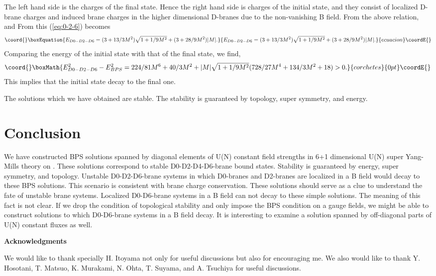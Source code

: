 \documentclass[a4paper,12pt]{article}
\begin{document}
The left hand side is the charges of the final state. Hence the right hand side is charges of the initial state, and they consist of localized D-brane charges and induced brane charges in the higher dimensional D-branes due to the non-vanishing B field. From the above relation, \coordHE{} and \coordHE{} From this (\ref{eq:0-2-6}) becomes
\begin{equation}\coord{}\boxEquation{
E_{D0-D2-D6}= (3+13/3M^2)\sqrt{1+1/9M^2} + (3+28/9M^2)|M|.
}{
E_{D0-D2-D6}= (3+13/3M^2)\sqrt{1+1/9M^2} + (3+28/9M^2)|M|.
}{ecuacion}\coordE{}\end{equation}
Comparing the energy of the initial state with that of the final state, we find,
\[\coord{}\boxMath{
E_{D0-D2-D6}^2-E_{BPS}^2 = 224/81M^6+40/3M^2+|M|\sqrt{1+1/9M^2}(728/27M^4+134/3M^2+18) > 0.
}{corchetes}{0pt}\coordE{}\]
This implies that the initial state decay to the final one.

 The solutions which we have obtained are stable. The stability is guaranteed by topology, super symmetry, and energy.

\section{Conclusion}
We have constructed BPS solutions spanned by diagonal elements of U(N) constant field strengths in 6+1 dimensional U(N) super Yang-Mills theory on \coordHE{}. These solutions correspond to stable D0-D2-D4-D6-brane bound states. Stability is guaranteed by energy, super symmetry, and topology. Unstable D0-D2-D6-brane systems in which D0-branes and D2-branes are localized in a B field would decay to these BPS solutions. This scenario is consistent with brane charge conservation. These solutions should serve as a clue to understand the fate of unstable brane systems. Localized D0-D6-brane systems in a B field can not decay to these simple solutions. The meaning of this fact is not clear. If we drop the condition of topological stability and only impose the BPS condition on a gauge fields, we might be able to construct solutions to which D0-D6-brane systems in a B field decay. It is interesting to examine a solution spanned by off-diagonal parts of U(N) constant fluxes as well. 

\vspace{2cm}

\textbf{\large Acknowledgments}

\vspace{5mm}
We would like to thank specially H. Itoyama not only for useful discussions but also for encouraging me. We also would like to thank Y. Hosotani, T. Matsuo, K. Murakami, N. Ohta, T. Suyama, and A. Tsuchiya for useful discussions.
\end{document}
